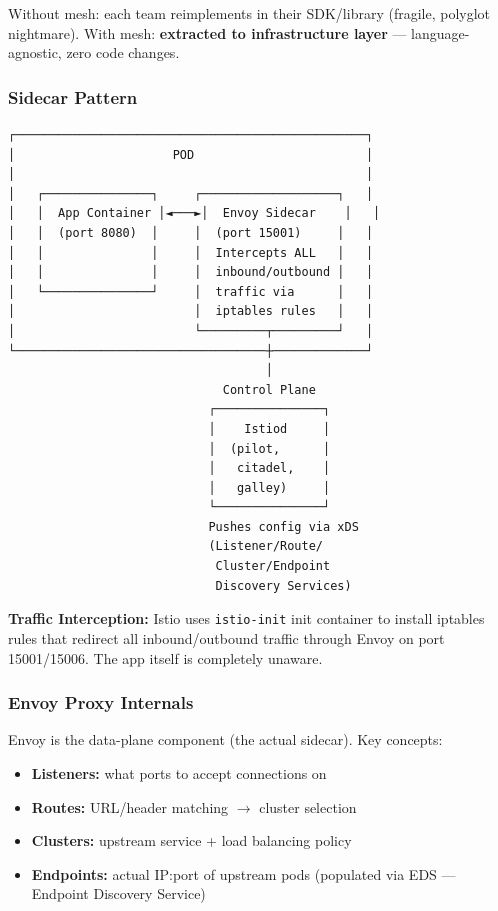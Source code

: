 \documentclass[11pt]{article}
\providecommand{\tightlist}{\setlength{\itemsep}{1pt}\setlength{\parskip}{0pt}}
\begin{document}
Without mesh: each team reimplements in their SDK/library (fragile, polyglot nightmare).
With mesh: \textbf{extracted to infrastructure layer} --- language-agnostic, zero code changes.

\subsubsection{Sidecar Pattern}\label{sidecar-pattern}

\setcodelang{}

\begin{verbatim}
┌─────────────────────────────────────────────────┐
│                      POD                        │
│                                                 │
│   ┌───────────────┐     ┌───────────────────┐   │
│   │  App Container │◄───►│  Envoy Sidecar    │   │
│   │  (port 8080)  │     │  (port 15001)     │   │
│   │               │     │  Intercepts ALL   │   │
│   │               │     │  inbound/outbound │   │
│   └───────────────┘     │  traffic via      │   │
│                         │  iptables rules   │   │
│                         └─────────┬─────────┘   │
└───────────────────────────────────┼─────────────┘
                                    │
                              Control Plane
                            ┌───────────────┐
                            │    Istiod     │
                            │  (pilot,      │
                            │   citadel,    │
                            │   galley)     │
                            └───────────────┘
                            Pushes config via xDS
                            (Listener/Route/
                             Cluster/Endpoint
                             Discovery Services)
\end{verbatim}

\textbf{Traffic Interception:} Istio uses \texttt{istio-init} init container to install iptables rules that redirect all inbound/outbound traffic through Envoy on port 15001/15006. The app itself is completely unaware.

\subsubsection{Envoy Proxy Internals}\label{envoy-proxy-internals}

Envoy is the data-plane component (the actual sidecar). Key concepts:

\begin{itemize}
\tightlist
\item
  \textbf{Listeners:} what ports to accept connections on
\item
  \textbf{Routes:} URL/header matching \(\rightarrow\) cluster selection
\item
  \textbf{Clusters:} upstream service + load balancing policy
\item
  \textbf{Endpoints:} actual IP:port of upstream pods (populated via EDS --- Endpoint Discovery Service)
\end{itemize}
\end{document}
